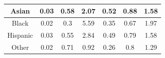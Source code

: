 \begin{table}[h]
{\begin{tabular}{ccccccc}
\multicolumn{1}{|c|}{Asian}                                                              & \multicolumn{1}{c|}{{\color[HTML]{FE0000} 0.03}}                                      & \multicolumn{1}{c|}{{\color[HTML]{FE0000} 0.58}}                                        & \multicolumn{1}{c|}{{\color[HTML]{FE0000} 2.07}}                                      & \multicolumn{1}{c|}{{\color[HTML]{FE0000} 0.52}}                                      & \multicolumn{1}{c|}{{\color[HTML]{32CB00} 0.88}}                                      & \multicolumn{1}{c|}{{\color[HTML]{FE0000} 1.58}}                                      \\ \hline
\multicolumn{1}{|c|}{Black}                                                              & \multicolumn{1}{c|}{{\color[HTML]{FE0000} 0.02}}                                      & \multicolumn{1}{c|}{{\color[HTML]{FE0000} 0.3}}                                         & \multicolumn{1}{c|}{{\color[HTML]{FE0000} 5.59}}                                      & \multicolumn{1}{c|}{{\color[HTML]{FE0000} 0.35}}                                      & \multicolumn{1}{c|}{{\color[HTML]{FE0000} 0.67}}                                      & \multicolumn{1}{c|}{{\color[HTML]{FE0000} 1.97}}                                      \\ \hline
\multicolumn{1}{|c|}{Hispanic}                                                           & \multicolumn{1}{c|}{{\color[HTML]{FE0000} 0.03}}                                      & \multicolumn{1}{c|}{{\color[HTML]{FE0000} 0.55}}                                        & \multicolumn{1}{c|}{{\color[HTML]{FE0000} 2.84}}                                      & \multicolumn{1}{c|}{{\color[HTML]{FE0000} 0.49}}                                      & \multicolumn{1}{c|}{{\color[HTML]{FE0000} 0.79}}                                      & \multicolumn{1}{c|}{{\color[HTML]{FE0000} 1.58}}                                      \\ \hline
\multicolumn{1}{|c|}{Other}                                                              & \multicolumn{1}{c|}{{\color[HTML]{FE0000} 0.02}}                                      & \multicolumn{1}{c|}{{\color[HTML]{FE0000} 0.71}}                                        & \multicolumn{1}{c|}{{\color[HTML]{32CB00} 0.92}}                                      & \multicolumn{1}{c|}{{\color[HTML]{FE0000} 0.26}}                                      & \multicolumn{1}{c|}{{\color[HTML]{FE0000} 0.8}}                                       & \multicolumn{1}{c|}{{\color[HTML]{FE0000} 1.29}}                                      \\ \hline

\end{tabular}}
\end{table}
